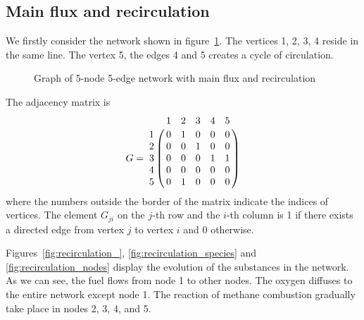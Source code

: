 \subsection{Main flux and recirculation}

We firstly consider the network shown in figure~\ref{fig:recirculation}. The vertices 1, 2, 3, 4 reside in the same line. The vertex 5, the edges 4 and 5 creates a cycle of circulation.

\begin{figure}[htbp]
    \centering
{}
\caption{Graph of 5-node 5-edge network with main flux and recirculation}
\label{fig:recirculation}
\end{figure}

The adjacency matrix is
\begin{equation}
    G = \bordermatrix{
        ~ & 1 & 2 & 3 & 4 & 5 \cr
        1 & 0 & 1 & 0 & 0 & 0 \cr
        2 & 0 & 0 & 1 & 0 & 0 \cr
        3 & 0 & 0 & 0 & 1 & 1 \cr
        4 & 0 & 0 & 0 & 0 & 0 \cr
        5 & 0 & 1 & 0 & 0 & 0 \cr}
\end{equation}
where the numbers outside the border of the matrix indicate the indices of vertices. The element $G_{ji}$ on the $j$-th row and the $i$-th column is 1 if there exists a directed edge from vertex $j$ to vertex $i$ and 0 otherwise.

Figures~\ref{fig:recirculation_}, \ref{fig:recirculation_species} and \ref{fig:recirculation_nodes} display the evolution of the substances in the network. As we can see, the fuel flows from node 1 to other nodes. The oxygen diffuses to the entire network except node 1. The reaction of methane combustion gradually take place in nodes 2, 3, 4, and 5.

